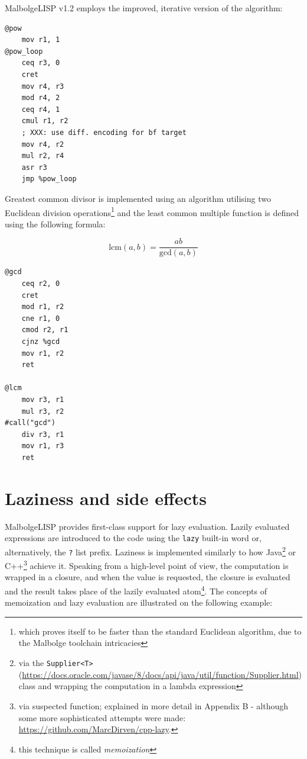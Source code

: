 \par MalbolgeLISP v1.2 employs the improved, iterative version of the algorithm:

\begin{verbatim}
@pow
    mov r1, 1
@pow_loop
    ceq r3, 0
    cret
    mov r4, r3
    mod r4, 2
    ceq r4, 1
    cmul r1, r2
    ; XXX: use diff. encoding for bf target
    mov r4, r2
    mul r2, r4
    asr r3
    jmp %pow_loop
\end{verbatim}

\par Greatest common divisor is implemented using an algorithm utilising two Euclidean division operations\footnote{which proves itself to be faster than the standard Euclidean algorithm, due to the Malbolge toolchain intricacies} and the least common multiple function is defined using the following formula:

\[
    \text{lcm}(a, b) = \frac{ab}{\text{gcd}(a, b)}
\]

\begin{verbatim}
@gcd
    ceq r2, 0
    cret
    mod r1, r2
    cne r1, 0
    cmod r2, r1
    cjnz %gcd
    mov r1, r2
    ret

@lcm
    mov r3, r1
    mul r3, r2
#call("gcd")
    div r3, r1
    mov r1, r3
    ret
\end{verbatim}

\section{Laziness and side effects}

\par MalbolgeLISP provides first-class support for lazy evaluation. Lazily evaluated expressions are introduced to the code using the \verb|lazy| built-in word or, alternatively, the \verb|?| list prefix. Laziness is implemented similarly to how Java\footnote{via the \verb|Supplier<T>| (\url{https://docs.oracle.com/javase/8/docs/api/java/util/function/Supplier.html}) class and wrapping the computation in a lambda expression} or C++\footnote{via suspected function; explained in more detail in Appendix B - although some more sophisticated attempts were made: \url{https://github.com/MarcDirven/cpp-lazy}.} achieve it. Speaking from a high-level point of view, the computation is wrapped in a closure, and when the value is requested, the closure is evaluated and the result takes place of the lazily evaluated atom\footnote{this technique is called \textit{memoization}}. The concepts of memoization and lazy evaluation are illustrated on the following example:

